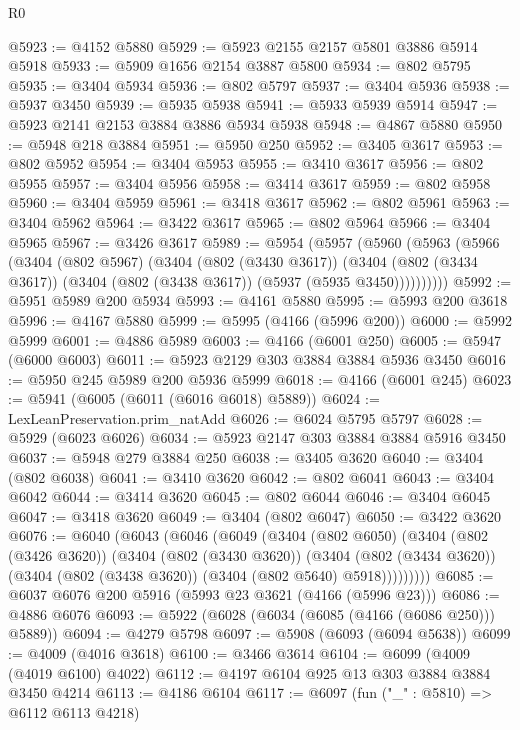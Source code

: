 \begin{lexlean}{R0}
\begin{coremodule}
@5923 := @4152 @5880
@5929 := @5923 @2155 @2157 @5801 @3886 @5914 @5918
@5933 := @5909 @1656 @2154 @3887 @5800
@5934 := @802 @5795
@5935 := @3404 @5934
@5936 := @802 @5797
@5937 := @3404 @5936
@5938 := @5937 @3450
@5939 := @5935 @5938
@5941 := @5933 @5939 @5914
@5947 := @5923 @2141 @2153 @3884 @3886 @5934 @5938
@5948 := @4867 @5880
@5950 := @5948 @218 @3884
@5951 := @5950 @250
@5952 := @3405 @3617
@5953 := @802 @5952
@5954 := @3404 @5953
@5955 := @3410 @3617
@5956 := @802 @5955
@5957 := @3404 @5956
@5958 := @3414 @3617
@5959 := @802 @5958
@5960 := @3404 @5959
@5961 := @3418 @3617
@5962 := @802 @5961
@5963 := @3404 @5962
@5964 := @3422 @3617
@5965 := @802 @5964
@5966 := @3404 @5965
@5967 := @3426 @3617
@5989 := @5954
    (@5957
      (@5960
        (@5963
          (@5966
            (@3404
              (@802 @5967)
              (@3404
                (@802 (@3430 @3617))
                (@3404
                  (@802 (@3434 @3617))
                  (@3404 (@802 (@3438 @3617)) (@5937 (@5935 @3450))))))))))
@5992 := @5951 @5989 @200 @5934
@5993 := @4161 @5880
@5995 := @5993 @200 @3618
@5996 := @4167 @5880
@5999 := @5995 (@4166 (@5996 @200))
@6000 := @5992 @5999
@6001 := @4886 @5989
@6003 := @4166 (@6001 @250)
@6005 := @5947 (@6000 @6003)
@6011 := @5923 @2129 @303 @3884 @3884 @5936 @3450
@6016 := @5950 @245 @5989 @200 @5936 @5999
@6018 := @4166 (@6001 @245)
@6023 := @5941 (@6005 (@6011 (@6016 @6018) @5889))
@6024 := LexLeanPreservation.prim_natAdd
@6026 := @6024 @5795 @5797
@6028 := @5929 (@6023 @6026)
@6034 := @5923 @2147 @303 @3884 @3884 @5916 @3450
@6037 := @5948 @279 @3884 @250
@6038 := @3405 @3620
@6040 := @3404 (@802 @6038)
@6041 := @3410 @3620
@6042 := @802 @6041
@6043 := @3404 @6042
@6044 := @3414 @3620
@6045 := @802 @6044
@6046 := @3404 @6045
@6047 := @3418 @3620
@6049 := @3404 (@802 @6047)
@6050 := @3422 @3620
@6076 := @6040
    (@6043
      (@6046
        (@6049
          (@3404
            (@802 @6050)
            (@3404
              (@802 (@3426 @3620))
              (@3404
                (@802 (@3430 @3620))
                (@3404
                  (@802 (@3434 @3620))
                  (@3404 (@802 (@3438 @3620)) (@3404 (@802 @5640) @5918)))))))))
@6085 := @6037 @6076 @200 @5916 (@5993 @23 @3621 (@4166 (@5996 @23)))
@6086 := @4886 @6076
@6093 := @5922 (@6028 (@6034 (@6085 (@4166 (@6086 @250))) @5889))
@6094 := @4279 @5798
@6097 := @5908 (@6093 (@6094 @5638))
@6099 := @4009 (@4016 @3618)
@6100 := @3466 @3614
@6104 := @6099 (@4009 (@4019 @6100) @4022)
@6112 := @4197 @6104 @925 @13 @303 @3884 @3884 @3450 @4214
@6113 := @4186 @6104
@6117 := @6097 (fun ("_" : @5810) => @6112 @6113 @4218)

\end{coremodule}
\end{lexlean}
